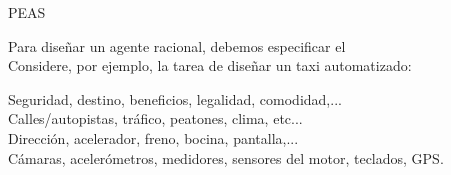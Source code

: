 \begin{frame}{PEAS}{}
 
Para diseñar un agente racional, debemos especificar el \\
\hfill\break
Considere, por ejemplo, la tarea de diseñar un taxi automatizado:
\hfill\break



 Seguridad, destino, beneficios, legalidad, comodidad,...\\
 Calles/autopistas, tráfico, peatones, clima, etc...\\
 Dirección, acelerador, freno, bocina, pantalla,...\\
 Cámaras, acelerómetros, medidores, sensores del motor, teclados, GPS.
\end{frame}